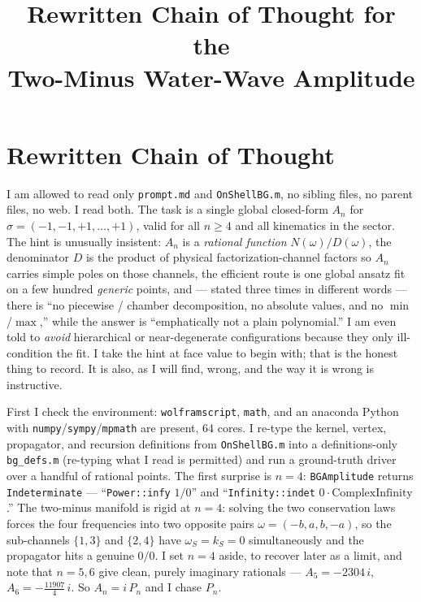 \documentclass{article}
\title{Rewritten Chain of Thought for the\\
Two-Minus Water-Wave Amplitude}
\author{}
\date{}
\begin{document}
\maketitle


\section*{Rewritten Chain of Thought}

I am allowed to read only \texttt{prompt.md} and \texttt{OnShellBG.m}, no sibling
files, no parent files, no web. I read both. The task is a single global
closed-form $A_n$ for $\sigma=(-1,-1,+1,\dots,+1)$, valid for all $n\ge4$ and all
kinematics in the sector. The hint is unusually insistent: $A_n$ is a
\emph{rational function} $N(\omega)/D(\omega)$, the denominator $D$ is the product
of physical factorization-channel factors so $A_n$ carries simple poles on those
channels, the efficient route is one global ansatz fit on a few hundred
\emph{generic} points, and --- stated three times in different words --- there is
``no piecewise / chamber decomposition, no absolute values, and no $\min$/$\max$,''
while the answer is ``emphatically not a plain polynomial.'' I am even told to
\emph{avoid} hierarchical or near-degenerate configurations because they only
ill-condition the fit. I take the hint at face value to begin with; that is the
honest thing to record. It is also, as I will find, wrong, and the way it is
wrong is instructive.

First I check the environment: \texttt{wolframscript}, \texttt{math}, and an
anaconda Python with \texttt{numpy}/\texttt{sympy}/\texttt{mpmath} are present, 64
cores. I re-type the kernel, vertex, propagator, and recursion definitions from
\texttt{OnShellBG.m} into a definitions-only \texttt{bg\_defs.m} (re-typing what I
read is permitted) and run a ground-truth driver over a handful of rational
points. The first surprise is $n=4$: \texttt{BGAmplitude} returns
\texttt{Indeterminate} --- ``\texttt{Power::infy} $1/0$'' and
``\texttt{Infinity::indet} $0\cdot\text{ComplexInfinity}$.'' The two-minus
manifold is rigid at $n=4$: solving the two conservation laws forces the four
frequencies into two opposite pairs $\omega=(-b,a,b,-a)$, so the sub-channels
$\{1,3\}$ and $\{2,4\}$ have $\omega_S=k_S=0$ simultaneously and the propagator
hits a genuine $0/0$. I set $n=4$ aside, to recover later as a limit, and note
that $n=5,6$ give clean, purely imaginary rationals --- $A_5=-2304\,i$,
$A_6=-\tfrac{11907}{4}\,i$. So $A_n=i\,P_n$ and I chase $P_n$.
\end{document}
